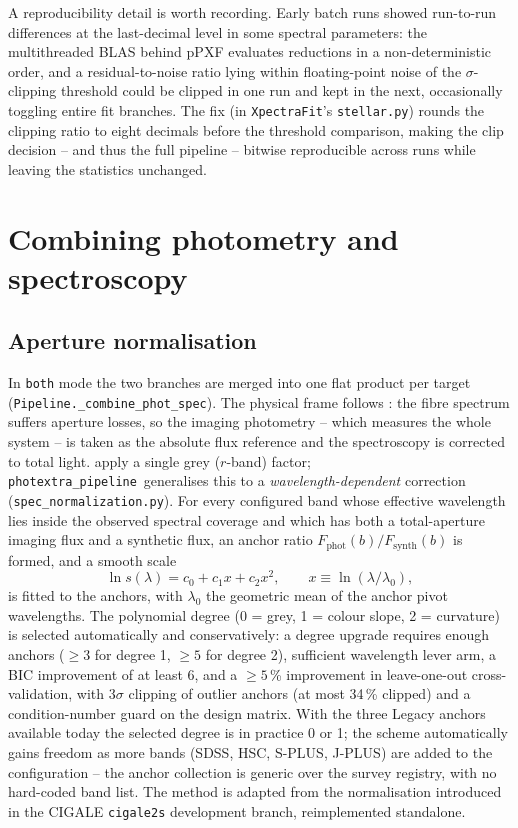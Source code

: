 \documentclass{aa}
\newcommand{\photextra}{\texttt{photextra\_pipeline}}
\newcommand{\xpectrafit}{\texttt{XpectraFit}}
\begin{document}
A reproducibility detail is worth recording. Early batch runs showed
run-to-run differences at the last-decimal level in some spectral
parameters: the multithreaded BLAS behind pPXF evaluates reductions in a
non-deterministic order, and a residual-to-noise ratio lying within
floating-point noise of the $\sigma$-clipping threshold could be clipped
in one run and kept in the next, occasionally toggling entire fit
branches. The fix (in \xpectrafit's \texttt{stellar.py}) rounds the
clipping ratio to eight decimals before the threshold comparison, making
the clip decision -- and thus the full pipeline -- bitwise reproducible
across runs while leaving the statistics unchanged.

\section{Combining photometry and spectroscopy}
\label{sec:combination}

\subsection{Aperture normalisation}
\label{sec:norm}

In \texttt{both} mode the two branches are merged into one flat product
per target (\texttt{Pipeline.\_combine\_phot\_spec}). The physical frame
follows \citet[][Sects.~3.2--3.3]{zou2024}: the fibre spectrum suffers
aperture losses, so the imaging photometry -- which measures the whole
system -- is taken as the absolute flux reference and the spectroscopy is
corrected to total light. \citet{zou2024} apply a single grey ($r$-band)
factor; \photextra\ generalises this to a \emph{wavelength-dependent}
correction (\texttt{spec\_normalization.py}). For every configured band
whose effective wavelength lies inside the observed spectral coverage and
which has both a total-aperture imaging flux and a synthetic flux, an
anchor ratio $F_\mathrm{phot}(b)/F_\mathrm{synth}(b)$ is formed, and a
smooth scale
\begin{equation}
\ln s(\lambda) = c_0 + c_1 x + c_2 x^2, \qquad
x \equiv \ln (\lambda/\lambda_0),
\label{eq:norm}
\end{equation}
is fitted to the anchors, with $\lambda_0$ the geometric mean of the
anchor pivot wavelengths. The polynomial degree (0 = grey, 1 = colour
slope, 2 = curvature) is selected automatically and conservatively: a
degree upgrade requires enough anchors ($\geq 3$ for degree 1, $\geq 5$
for degree 2), sufficient wavelength lever arm, a BIC improvement of at
least 6, and a $\geq 5$\,\% improvement in leave-one-out cross-validation,
with 3$\sigma$ clipping of outlier anchors (at most 34\,\% clipped) and a
condition-number guard on the design matrix. With the three Legacy
anchors available today the selected degree is in practice 0 or 1; the
scheme automatically gains freedom as more bands (SDSS, HSC, S-PLUS,
J-PLUS) are added to the configuration -- the anchor collection is
generic over the survey registry, with no hard-coded band list. The
method is adapted from the normalisation introduced in the CIGALE
\texttt{cigale2s} development branch, reimplemented standalone.
\end{document}
